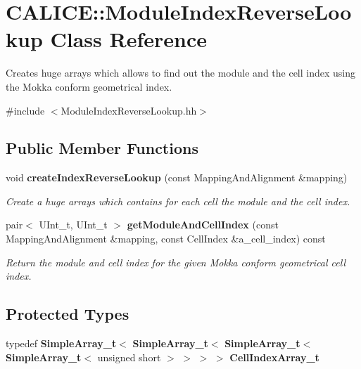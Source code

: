 \section{CALICE::ModuleIndexReverseLookup Class Reference}
\label{classCALICE_1_1ModuleIndexReverseLookup}


Creates huge arrays which allows to find out the module and the cell index using the Mokka conform geometrical index.  


{\ttfamily \#include $<$ModuleIndexReverseLookup.hh$>$}\subsection*{Public Member Functions}
\begin{DoxyCompactItemize}
\item 
void {\bf createIndexReverseLookup} (const MappingAndAlignment \&mapping)
\begin{DoxyCompactList}\small\item\em Create a huge arrays which contains for each cell the module and the cell index. \item\end{DoxyCompactList}\item 
pair$<$ UInt\_\-t, UInt\_\-t $>$ {\bf getModuleAndCellIndex} (const MappingAndAlignment \&mapping, const CellIndex \&a\_\-cell\_\-index) const 
\begin{DoxyCompactList}\small\item\em Return the module and cell index for the given Mokka conform geometrical cell index. \item\end{DoxyCompactList}\end{DoxyCompactItemize}
\subsection*{Protected Types}
\begin{DoxyCompactItemize}
\item 
typedef {\bf SimpleArray\_\-t}$<$ {\bf SimpleArray\_\-t}$<$ {\bf SimpleArray\_\-t}$<$ {\bf SimpleArray\_\-t}$<$ unsigned short $>$ $>$ $>$ $>$ {\bfseries CellIndexArray\_\-t}\label{classCALICE_1_1ModuleIndexReverseLookup_a3cb8a61f3dc239ac5ffbee685bf6988f}

\end{DoxyCompactItemize}
